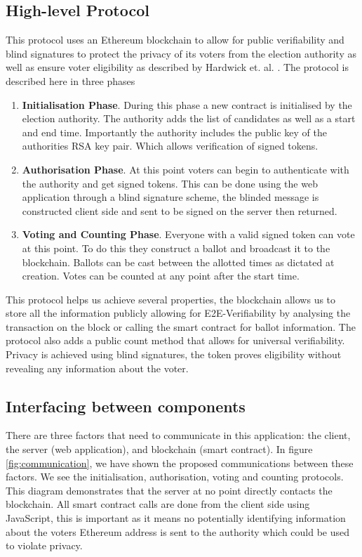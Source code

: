 \documentclass{entcs}
\begin{document}
\subsection{High-level Protocol} 
This protocol uses an Ethereum blockchain to allow for public verifiability and blind signatures to protect the privacy of its voters from the election authority as well as ensure voter eligibility as described by Hardwick et. al. \cite{hardwick2018}. The protocol is described here in three phases
\begin{enumerate}
    \item \textbf{Initialisation Phase}. During this phase a new contract is initialised by the election authority. The authority adds the list of candidates as well as a start and end time. Importantly the authority includes the public key of the authorities RSA key pair. Which allows verification of signed tokens.
    \item \textbf{Authorisation Phase}. At this point voters can begin to authenticate with the authority and get signed tokens. This can be done using the web application through a blind signature scheme, the blinded message is constructed client side and sent to be signed on the server then returned.
    \item \textbf{Voting and Counting Phase}. Everyone with a valid signed token can vote at this point. To do this they construct a ballot and broadcast it to the blockchain. Ballots can be cast between the allotted times as dictated at creation. Votes can be counted at any point after the start time.
\end{enumerate}

This protocol helps us achieve several properties, the blockchain allows us to store all the information publicly allowing for E2E-Verifiability by analysing the transaction on the block or calling the smart contract for ballot information. The protocol also adds a public count method that allows for universal verifiability. Privacy is achieved using blind signatures, the token proves eligibility without revealing any information about the voter.

\subsection{Interfacing between components}
There are three factors that need to communicate in this application: the client, the server (web application), and blockchain (smart contract). In figure \ref{fig:communication}, we have shown the proposed communications between these factors. We see the initialisation, authorisation, voting and counting protocols. This diagram demonstrates that the server at no point directly contacts the blockchain. All smart contract calls are done from the client side using JavaScript, this is important as it means no potentially identifying information about the voters Ethereum address is sent to the authority which could be used to violate privacy.
\end{document}
